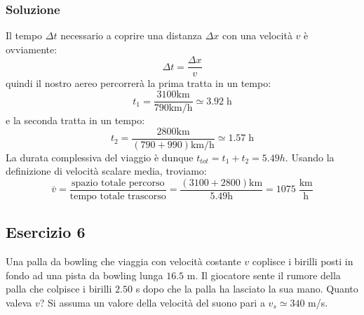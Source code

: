 \documentclass[12pt,a4paper]{book}
\begin{document}
\subsubsection*{Soluzione}
Il tempo $\Delta t$ necessario a coprire una distanza $\Delta x$ con una velocità $v$ è ovviamente:
\begin{equation*}
\Delta t= \frac{\Delta x}{v}
\end{equation*}
quindi il nostro aereo percorrerà la prima tratta in un tempo:
\begin{equation*}
t_{1}=\frac{3100 \text{km}}{790 \text{km/h}}\simeq3.92\;\text{h}
\end{equation*}
e la seconda tratta in un tempo:
\begin{equation*}
t_{2}=\frac{2800 \text{km}}{(790+990) \text{km/h}}\simeq1.57 \;\text{h}
\end{equation*} 
La durata complessiva del viaggio è dunque $t_{tot}= t_{1}+t_{2}= 5.49 h$. Usando la definizione di velocità scalare media, troviamo:
\begin{equation*}
\bar{v}=\frac{\text{spazio  totale percorso}}{\text{tempo totale trascorso}}= \frac{(3100+2800) \text{km} }{5.49 \text{h}}=1075\; \frac{\text{km}}{\text{h}}
\end{equation*}


\subsection*{Esercizio 6} 
Una palla da bowling che viaggia con velocità costante $v$ coplisce i birilli posti in fondo ad una pista da bowling lunga $16.5$ m. Il giocatore sente il rumore della palla che colpisce i birilli $2.50$ s dopo che la palla ha lasciato la sua mano. Quanto valeva $v$? Si assuma un valore della velocità del suono pari a $v_s\simeq340$ m/s.
\end{document}
